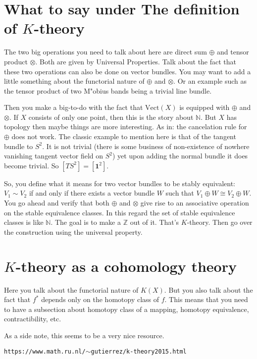 \documentclass[11pt]{amsart}
\newcommand{\<}{\langle}
\renewcommand{\>}{\rangle}
\newcommand{\N}{\mathbb{N}}
\newcommand{\Z}{\mathbb{Z}}
\begin{document}
\section{What to say under The definition of $K$-theory}

The two big operations you need to talk about here are direct sum $\oplus$ and tensor product $\otimes$. Both are given by Universal Properties. Talk about the fact that these two operations can also be done on vector bundles. You may want to add a little something about the functorial nature of $\oplus$ and $\otimes$. Or an example such as the tensor product of two M"obius bands being a trivial line bundle. 

Then you make a big-to-do with the fact that $\mathrm{Vect}(X)$ is equipped with $\oplus$ and $\otimes$. If $X$ consists of only one point, then this is the story about $\N$. But $X$ has topology then maybe things are more interesting. As in: the cancelation rule for $\oplus$ does not work. The classic example to mention here is that of the tangent bundle to $S^2$. It is not trivial (there is some business of non-existence of nowhere vanishing tangent vector field on $S^2$) yet upon adding the normal bundle it does become trivial. So $[TS^2]=[\mathbf{1}^2]$.

So, you define what it means for two vector bundles to be stably equivalent: $V_1\sim V_2$ if and only if there exists a vector bundle $W$ such that $V_1\oplus W\cong V_2\oplus W$.  You go ahead and verify that both $\oplus$ and $\otimes$ give rise to an associative operation on the stable equivalence classes. In this regard the set of stable equivalence classes is like $\N$. The goal is to make a $\Z$ out of it. That's $K$-theory. Then go over the construction using the universal property. 

\section{$K$-theory as a cohomology theory}

Here you talk about the functorial nature of $K(X)$. But you also talk about the fact that $f^*$ depends only on the homotopy class of $f$. This means that you need to have a subsection about homotopy class of a mapping, homotopy equivalence, contractibility, etc. 

As a side note, this seems to be a very nice resource. 

\texttt{https://www.math.ru.nl/$\sim$gutierrez/k-theory2015.html}
\end{document}
